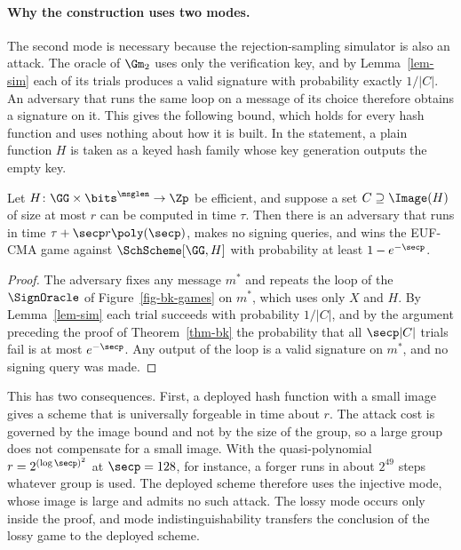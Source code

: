 \paragraph*{Why the construction uses two modes.} The second mode is necessary because the rejection-sampling simulator is also an attack. The oracle of $\Gm_2$ uses only the verification key, and by Lemma~\ref{lem-sim} each of its trials produces a valid signature with probability exactly $1/|C|$. An adversary that runs the same loop on a message of its choice therefore obtains a signature on it. This gives the following bound, which holds for every hash function and uses nothing about how it is built. In the statement, a plain function $H$ is taken as a keyed hash family whose key generation outputs the empty key.

\begin{proposition} \label{prop-lossy-forge}
Let $H \colon \GG \times \bits^{\msglen} \to \Zp$ be efficient, and suppose a set $C \supseteq \Image(H)$ of size at most $r$ can be computed in time $\tau$. Then there is an adversary that runs in time $\tau + \secp r \poly(\secp)$, makes no signing queries, and wins the EUF-CMA game against $\SchScheme[\GG,H]$ with probability at least $1 - e^{-\secp}$.
\end{proposition}

\begin{proof}
The adversary fixes any message $m^*$ and repeats the loop of the $\SignOracle$ of Figure~\ref{fig-bk-games} on $m^*$, which uses only $X$ and $H$. By Lemma~\ref{lem-sim} each trial succeeds with probability $1/|C|$, and by the argument preceding the proof of Theorem~\ref{thm-bk} the probability that all $\secp|C|$ trials fail is at most $e^{-\secp}$. Any output of the loop is a valid signature on $m^*$, and no signing query was made.
\end{proof}

This has two consequences. First, a deployed hash function with a small image gives a scheme that is universally forgeable in time about $r$. The attack cost is governed by the image bound and not by the size of the group, so a large group does not compensate for a small image. With the quasi-polynomial $r = 2^{(\log \secp)^2}$ at $\secp = 128$, for instance, a forger runs in about $2^{49}$ steps whatever group is used. The deployed scheme therefore uses the injective mode, whose image is large and admits no such attack. The lossy mode occurs only inside the proof, and mode indistinguishability transfers the conclusion of the lossy game to the deployed scheme.

